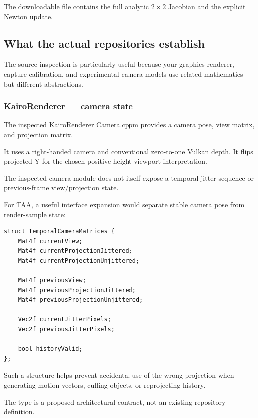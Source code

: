 The downloadable file contains the full analytic \(2\times2\) Jacobian and the explicit Newton update.

\subsection{What the actual repositories establish}\label{02-foundations-ii-ch037-what-the-actual-repositories-establish}

The source inspection is particularly useful because your graphics renderer, capture calibration, and experimental camera models use related mathematics but different abstractions.

\subsubsection{KairoRenderer --- camera state}\label{02-foundations-ii-ch037-kairorenderer-camera-state}

The inspected \href{https://github.com/swayam8624/KairoRenderer/blob/main/Camera.cppm?utm_source=chatgpt.com}{KairoRenderer Camera.cppm} provides a camera pose, view matrix, and projection matrix.

It uses a right-handed camera and conventional zero-to-one Vulkan depth. It flips projected Y for the chosen positive-height viewport interpretation.

The inspected camera module does not itself expose a temporal jitter sequence or previous-frame view/projection state.

For TAA, a useful interface expansion would separate stable camera pose from render-sample state:

\begin{verbatim}
struct TemporalCameraMatrices {
    Mat4f currentView;
    Mat4f currentProjectionJittered;
    Mat4f currentProjectionUnjittered;

    Mat4f previousView;
    Mat4f previousProjectionJittered;
    Mat4f previousProjectionUnjittered;

    Vec2f currentJitterPixels;
    Vec2f previousJitterPixels;

    bool historyValid;
};
\end{verbatim}

Such a structure helps prevent accidental use of the wrong projection when generating motion vectors, culling objects, or reprojecting history.

The type is a proposed architectural contract, not an existing repository definition.

